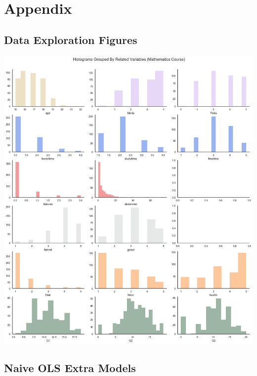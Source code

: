 \documentclass[12pt]{article}
\begin{document}
\newpage
\section{Appendix}

\subsection{Data Exploration Figures}

\includegraphics[scale=0.5]{figures/quantvar_hist_math.png}


\subsection{Naive OLS Extra Models}
\end{document}
